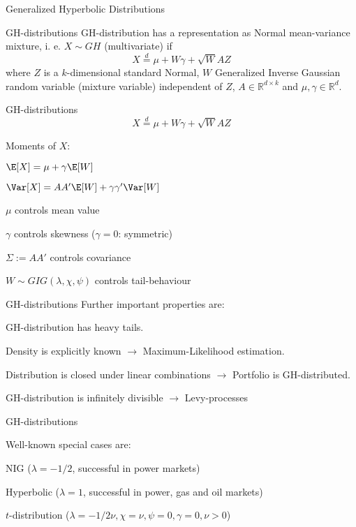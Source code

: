 {Generalized Hyperbolic Distributions}

{GH-distributions} GH-distribution has a
representation as Normal mean-variance mixture, i. e. $X\sim GH$
(multivariate) if
$$X\stackrel{d}{=}\mu+W\gamma+\sqrt{W}AZ$$
where $Z$ is a $k$-dimensional standard Normal, $W$ Generalized
Inverse Gaussian random variable (mixture variable) independent of
$Z$, $A\in\mathbb{R}^{d\times k}$ and $\mu, \gamma \in
\mathbb{R}^d$.

{GH-distributions} %
$$X\stackrel{d}{=}\mu+W\gamma+\sqrt{W}AZ$$
\item Moments of $X$:
    \item $\E[X]=\mu+\gamma\E[W]$
    \item $\Var[X]=AA'\E[W]+\gamma\gamma'\Var[W]$\\[-1.5cm]
\item $\mu$ controls mean value\\[-1.5cm]
\item $\gamma$ controls skewness ($\gamma=0$: symmetric)\\[-1.5cm]
\item $\Sigma:=AA'$ controls covariance\\[-1.5cm]
\item $W\sim GIG(\lambda,\chi,\psi)$ controls tail-behaviour

{GH-distributions} %
Further important properties
are: %
\item GH-distribution has heavy tails. \item Density is explicitly
known $\rightarrow$ Maximum-Likelihood estimation. \item
Distribution is closed under linear combinations $\rightarrow$
Portfolio is GH-distributed. \item GH-distribution is infinitely
divisible $\rightarrow$ Levy-processes

{GH-distributions}

Well-known special cases are:
\item NIG ($\lambda=-1/2$, successful in power markets)\\[-1.5cm]
\item Hyperbolic ($\lambda=1$, successful in power, gas and oil markets)\\[-1.5cm]
\item $t$-distribution ($\lambda=-1/2\nu, \chi=\nu, \psi=0,
\gamma=0, \nu>0$)

